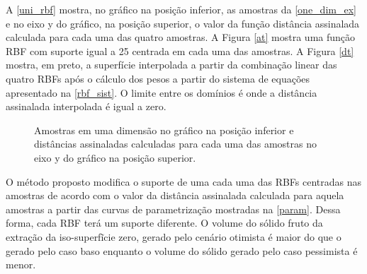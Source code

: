 A \autoref{uni_rbf} mostra, no gráfico na posição inferior, as amostras da \autoref{one_dim_ex} e no eixo y do gráfico, na posição superior, o valor da função distância assinalada calculada para cada uma das quatro amostras. A Figura \autoref{at} mostra uma função RBF com suporte igual a 25 centrada em cada uma das amostras. A Figura \autoref{dt} mostra, em preto, a superfície interpolada a partir da combinação linear das quatro RBFs após o cálculo dos pesos a partir do sistema de equações apresentado na \autoref{rbf_sist}. O limite entre os domínios é onde a distância assinalada interpolada é igual a zero.

\begin{figure}[H] 
    \centering
    \caption{Amostras em uma dimensão no gráfico na posição inferior e distâncias assinaladas calculadas para cada uma das amostras no eixo y do gráfico na posição superior.} \label{uni_rbf}
     \hspace{1em}
\end{figure}

O método proposto modifica o suporte de uma cada uma das RBFs centradas nas amostras de acordo com o valor da distância assinalada calculada para aquela amostras a partir das curvas de parametrização mostradas na \autoref{param}. Dessa forma, cada RBF terá um suporte diferente. O volume do sólido fruto da extração da iso-superfĩcie zero, gerado pelo cenário otimista é maior do que o gerado pelo caso baso enquanto o volume do sólido gerado pelo caso pessimista é menor.

